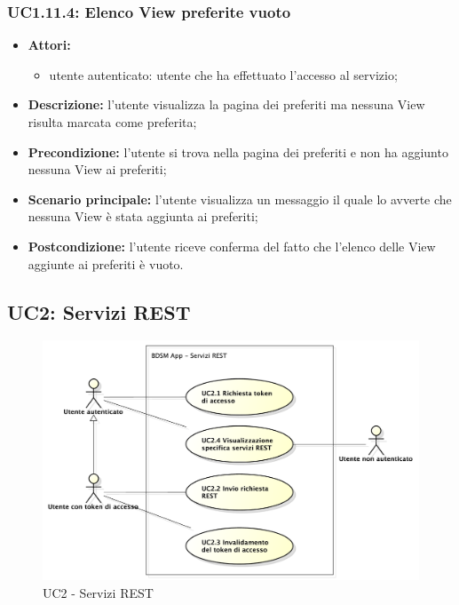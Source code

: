 \subsubsection{UC1.11.4: Elenco View preferite vuoto}
\begin{itemize}
	\item \textbf{Attori:}
	\begin{itemize}
		\item utente autenticato: utente che ha effettuato l'accesso al servizio;
	\end{itemize}
	\item \textbf{Descrizione:} l'utente visualizza la pagina dei preferiti ma nessuna View risulta marcata come preferita;
	\item \textbf{Precondizione:} l'utente si trova nella pagina dei preferiti e non ha aggiunto nessuna View ai preferiti;
	\item \textbf{Scenario principale:} l'utente visualizza un messaggio il quale lo avverte che nessuna View è stata aggiunta ai preferiti;
	\item \textbf{Postcondizione:} l'utente riceve conferma del fatto che l'elenco delle View aggiunte ai preferiti è vuoto.
\end{itemize}

\pagebreak



\subsection{UC2: Servizi REST}
\begin{figure}[htbp]
	\centering
	\centerline{\includegraphics[scale=0.50]{./images/UC2.pdf}}
	\caption{UC2 - Servizi REST}
\end{figure}

